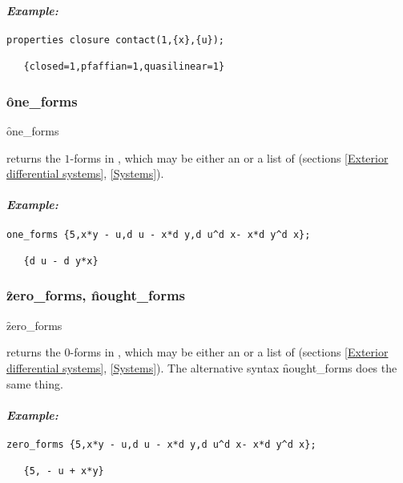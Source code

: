 \paragraph{\textit{Example:}}
\begin{verbatim}
properties closure contact(1,{x},{u});

   {closed=1,pfaffian=1,quasilinear=1}
\end{verbatim}


\subsubsection{\f{one\_forms}}
\label{one_forms}

\hypertarget{operator:ONE_FORMS}{}
\begin{syntax}
	\f{one\_forms} 
\end{syntax}
returns the $1$-forms in , which may be either an  or a
list of  (sections \ref{Exterior differential systems},
\ref{Systems}).

\paragraph{\textit{Example:}}
\begin{verbatim}
one_forms {5,x*y - u,d u - x*d y,d u^d x- x*d y^d x};

   {d u - d y*x}
\end{verbatim}

\subsubsection{\f{zero\_forms}, \f{nought\_forms}}
\label{zero_forms}

\hypertarget{operator:ZERO_FORMS}{}
\hypertarget{operator:NOUGHT_FORMS}{}
\begin{syntax}
	\f{zero\_forms} 
\end{syntax}
returns the $0$-forms in , which may be either an  or a
list of  (sections \ref{Exterior differential systems},
\ref{Systems}). The alternative syntax \f{nought\_forms} does the same thing.

\paragraph{\textit{Example:}}
\begin{verbatim}
zero_forms {5,x*y - u,d u - x*d y,d u^d x- x*d y^d x};

   {5, - u + x*y}
\end{verbatim}

